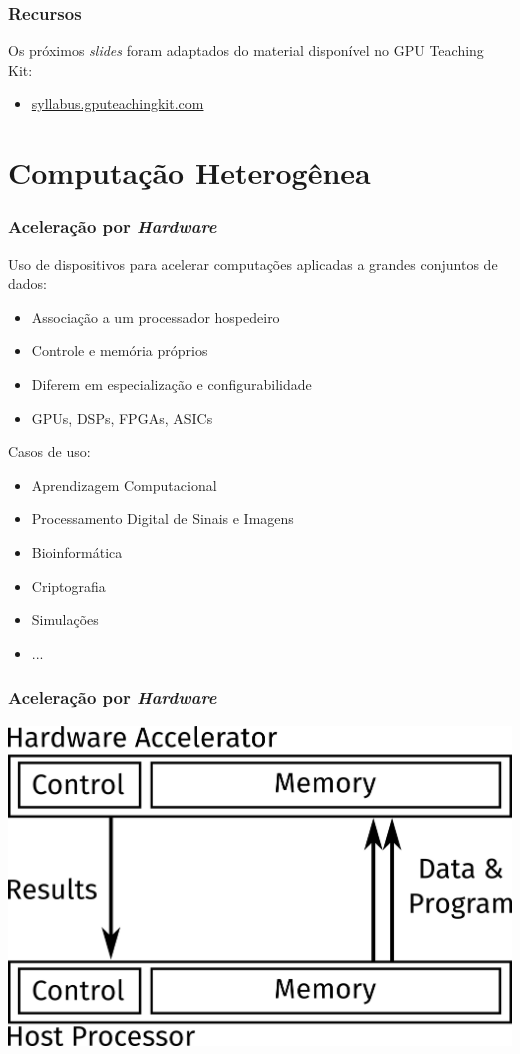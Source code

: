 \documentclass[10pt, compress]{beamer}
\begin{document}
\begin{frame}
    \frametitle{Recursos}

    Os próximos \emph{slides} foram adaptados do
    material disponível no \alert{GPU Teaching Kit}:
    \begin{itemize}
        \item \url{syllabus.gputeachingkit.com}
    \end{itemize}

\end{frame}

\section*{Computação Heterogênea}

\begin{frame}
    \frametitle{Aceleração por \textit{Hardware}}
    Uso de \alert{dispositivos} para acelerar computações aplicadas a grandes
    conjuntos de dados:
    \begin{itemize}
        \item Associação a um processador \alert{hospedeiro}
            \pause
        \item Controle e memória próprios
            \pause
        \item Diferem em especialização e configurabilidade
            \pause
        \item \alert{GPUs}, DSPs, FPGAs, ASICs
    \end{itemize}
    \pause
    Casos de uso:
    \begin{itemize}
        \item Aprendizagem Computacional
        \item Processamento Digital de Sinais e Imagens
        \item Bioinformática
        \item Criptografia
        \item Simulações
        \item ...
    \end{itemize}
\end{frame}

\begin{frame}
    \frametitle{Aceleração por \textit{Hardware}}
    \centering
    \includegraphics[width=.8\textwidth]{accel}
\end{frame}
\end{document}
